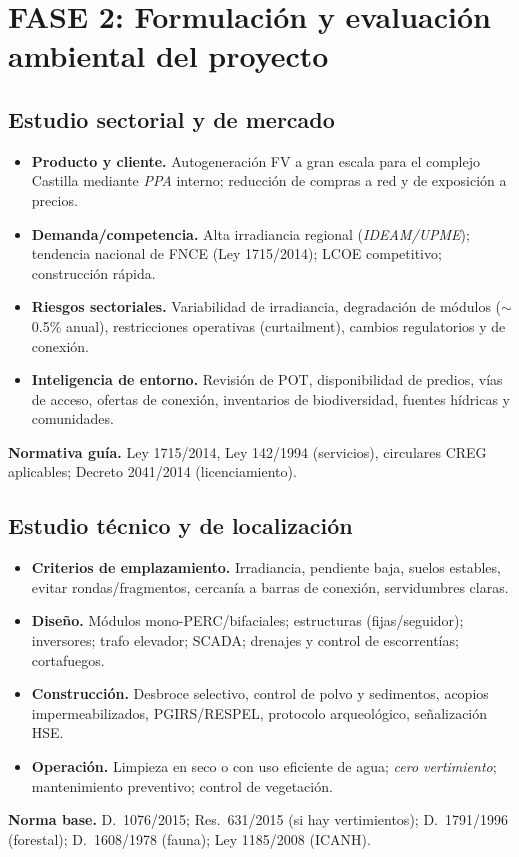 \section{FASE 2: Formulación y evaluación ambiental del proyecto}

\subsection{Estudio sectorial y de mercado}
\begin{itemize}
  \item \textbf{Producto y cliente.} Autogeneración FV a gran escala para el complejo Castilla mediante \emph{PPA} interno; reducción de compras a red y de exposición a precios.
  \item \textbf{Demanda/competencia.} Alta irradiancia regional (\emph{IDEAM/UPME}); tendencia nacional de FNCE (Ley 1715/2014); LCOE competitivo; construcción rápida.
  \item \textbf{Riesgos sectoriales.} Variabilidad de irradiancia, degradación de módulos ($\sim$0.5\% anual), restricciones operativas (curtailment), cambios regulatorios y de conexión.
  \item \textbf{Inteligencia de entorno.} Revisión de POT, disponibilidad de predios, vías de acceso, ofertas de conexión, inventarios de biodiversidad, fuentes hídricas y comunidades.
\end{itemize}

\medskip
\textbf{Normativa guía.} Ley 1715/2014, Ley 142/1994 (servicios), circulares CREG aplicables; Decreto 2041/2014 (licenciamiento).

\subsection{Estudio técnico y de localización}
\begin{itemize}
  \item \textbf{Criterios de emplazamiento.} Irradiancia, pendiente baja, suelos estables, evitar rondas/fragmentos, cercanía a barras de conexión, servidumbres claras.
  \item \textbf{Diseño.} Módulos mono-PERC/bifaciales; estructuras (fijas/seguidor); inversores; trafo elevador; SCADA; drenajes y control de escorrentías; cortafuegos.
  \item \textbf{Construcción.} Desbroce selectivo, control de polvo y sedimentos, acopios impermeabilizados, PGIRS/RESPEL, protocolo arqueológico, señalización HSE.
  \item \textbf{Operación.} Limpieza en seco o con uso eficiente de agua; \textit{cero vertimiento}; mantenimiento preventivo; control de vegetación.
\end{itemize}
\textbf{Norma base.} D.~1076/2015; Res.~631/2015 (si hay vertimientos); D.~1791/1996 (forestal); D.~1608/1978 (fauna); Ley 1185/2008 (ICANH).

